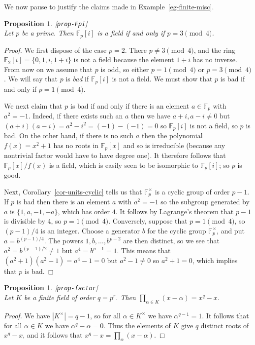 \documentclass{amsart}
\newcommand{\lbl}[1]{\label{#1}\textup{[\texttt{#1}]}\ \\}
\newcommand{\lbl}{\label}
\newcommand{\F}         {{\mathbb{F}}}
\newcommand{\al}        {\alpha}
\newcommand{\tm}        {\times}
\renewcommand{\:}{\colon}
\newtheorem{proposition}[theorem]{Proposition}
\theoremstyle{definition}
\begin{document}
We now pause to justify the claims made in Example~\ref{eg-finite-misc}.
\begin{proposition}\lbl{prop-Fpi}
 Let $p$ be a prime.  Then $\F_p[i]$ is a field if and only if
 $p=3\pmod{4}$. 
\end{proposition}
\begin{proof}
 We first dispose of the case $p=2$.  There $p\neq 3\pmod{4}$, and the
 ring $\F_2[i]=\{0,1,i,1+i\}$ is not a field because the element $1+i$
 has no inverse.  From now on we assume that $p$ is odd, so either
 $p=1\pmod{4}$ or $p=3\pmod{4}$.  We will say that $p$ is \emph{bad}
 if $\F_p[i]$ is not a field.  We must show that $p$ is bad if and
 only if $p=1\pmod{4}$.

 We next claim that $p$ is bad if and only if there is an element
 $a\in\F_p$ with $a^2=-1$.  Indeed, if there exists such an $a$ then
 we have $a+i,a-i\neq 0$ but $(a+i)(a-i)=a^2-i^2=(-1)-(-1)=0$ so
 $\F_p[i]$ is not a field, so $p$ is bad.  On the other hand, if there
 is no such $a$ then the polynomial $f(x)=x^2+1$ has no roots in
 $\F_p[x]$ and so is irreducible (because any nontrivial factor would
 have to have degree one).  It therefore follows that $\F_p[x]/f(x)$
 is a field, which is easily seen to be isomorphic to $\F_p[i]$; so
 $p$ is good.

 Next, Corollary~\ref{cor-units-cyclic} tells us that $\F_p^\tm$ is a
 cyclic group of order $p-1$.  If $p$ is bad then there is an element
 $a$ with $a^2=-1$ so the subgroup generated by $a$ is
 $\{1,a,-1,-a\}$, which has order $4$.  It follows by Lagrange's
 theorem that $p-1$ is divisible by $4$, so $p=1\pmod{4}$.
 Conversely, suppose that $p=1\pmod{4}$, so $(p-1)/4$ is an integer.
 Choose a generator $b$ for the cyclic group $\F_p^\tm$, and put
 $a=b^{(p-1)/4}$.  The powers $1,b,\dotsc,b^{p-2}$ are then distinct,
 so we see that $a^2=b^{(p-1)/2}\neq 1$ but $a^4=b^{p-1}=1$.  This
 means that $(a^2+1)(a^2-1)=a^4-1=0$ but $a^2-1\neq 0$ so $a^2+1=0$,
 which implies that $p$ is bad.
\end{proof}

\begin{proposition}\lbl{prop-factor}
 Let $K$ be a finite field of order $q=p^r$.  Then 
 $\prod_{\al\in K}(x-\al)=x^q-x$.
\end{proposition}
\begin{proof}
 We have $|K^\tm|=q-1$, so for all $\al\in K^\tm$ we have $\al^{q-1}=1$.
 It follows that for all $\al\in K$ we have $\al^q-\al=0$.  Thus the
 elements of $K$ give $q$ distinct roots of $x^q-x$, and it follows
 that $x^q-x=\prod_\al(x-\al)$.
\end{proof}
\end{document}
